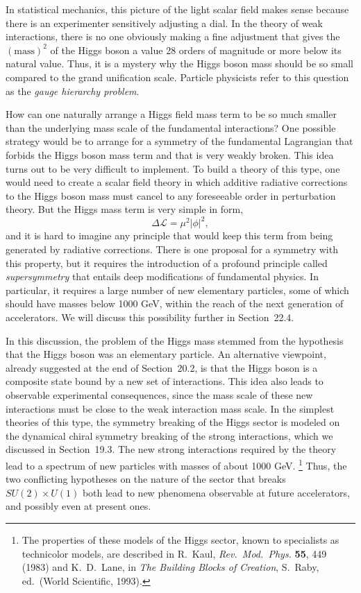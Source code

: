 In statistical mechanics, this picture of the light scalar field makes sense
because there is an experimenter sensitively adjusting a dial.  In the theory
of weak interactions, there is no one obviously making a fine adjustment that
gives the $(\mathrm{mass})^2$ of the Higgs boson a value 28 orders of
magnitude or more below its natural value.  Thus, it is a mystery why the
Higgs boson mass should be so small compared to the grand unification scale.
Particle physicists refer to this question as the \emph{gauge hierarchy
problem}.

How can one naturally arrange a Higgs field mass term to be so much smaller
than the underlying mass scale of the fundamental interactions?  One
possible strategy would be to arrange for a symmetry of the fundamental
Lagrangian that forbids the Higgs boson mass term and that is very weakly
broken.  This idea turns out to be very difficult to implement.  To build a
theory of this type, one would need to create a scalar field theory in which
additive radiative corrections to the Higgs boson mass must cancel to any
foreseeable order in perturbation theory.  But the Higgs mass term is very
simple in form,
\begin{equation}
  \Delta\mathcal{L} = \mu^2|\phi|^2 ,
  \label{eq:22.9}
\end{equation}
and it is hard to imagine any principle that would keep this term from being
generated by radiative corrections.  There is one proposal for a symmetry
with this property, but it requires the introduction of a profound principle
called \emph{supersymmetry} that entails deep modifications of fundamental
physics.  In particular, it requires a large number of new elementary
particles, some of which should have masses below 1000 GeV, within the reach
of the next generation of accelerators.  We will discuss this possibility
further in Section~22.4.

In this discussion, the problem of the Higgs mass stemmed from the hypothesis
that the Higgs boson was an elementary particle.  An alternative viewpoint,
already suggested at the end of Section~20.2, is that the Higgs boson is a
composite state bound by a new set of interactions.  This idea also leads to
observable experimental consequences, since the mass scale of these new
interactions must be close to the weak interaction mass scale.  In the
simplest theories of this type, the symmetry breaking of the Higgs sector is
modeled on the dynamical chiral symmetry breaking of the strong
interactions, which we discussed in Section~19.3.  The new strong
interactions required by the theory lead to a spectrum of new particles with
masses of about 1000 GeV.%
\footnote{The properties of these models of the Higgs sector, known to
specialists as technicolor models, are described in R.~Kaul,
\emph{Rev.\ Mod.\ Phys.} \textbf{55}, 449 (1983) and K.~D.~Lane, in
\emph{The Building Blocks of Creation}, S.~Raby, ed.\ (World Scientific,
1993).}  Thus, the two conflicting hypotheses on the nature of the sector
that breaks $SU(2)\times U(1)$ both lead to new phenomena observable at
future accelerators, and possibly even at present ones.

